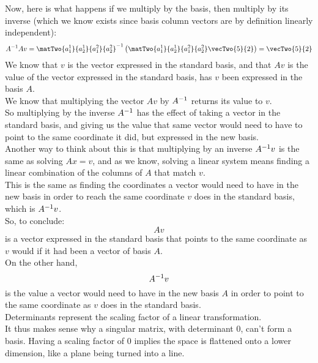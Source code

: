 \documentclass[12pt]{article}
\begin{document}
Now, here is what happens if we multiply by 
the basis, then multiply by its inverse 
(which we know exists since basis column vectors
are by definition linearly independent):
\[ A\inv Av = 
\matTwo{a_1^1}{a_2^1}{a_1^2}{a_2^2}\inv
\para{\matTwo{a_1^1}{a_2^1}{a_1^2}{a_2^2}
\vecTwo{5}{2}}
= \vecTwo{5}{2} \]
We know that $v$ is the vector
expressed in the standard basis,
and that $Av$ is the value of the vector
expressed in the standard basis,
has $v$ been expressed in the basis $A$. \\
We know that multiplying the vector $Av$ by $A^{-1}$
returns its value to $v$. \\ 
So multiplying by the inverse $A^{-1}$
has the effect of taking a vector
in the standard basis,
and giving us the value that same vector
would need to have to point to the same coordinate
it did, but expressed in the new basis. \\

Another way to think about this is that
multiplying by an inverse $A^{-1} v$
is the same as solving $Ax = v$,
and as we know,
solving a linear system
means finding a linear combination 
of the columns of $A$ that match $v$. \\
This is the same as finding the coordinates
a vector would need to have in the new basis
in order to reach the same coordinate $v$
does in the standard basis, which is $A^{-1} v$. \\

So, to conclude:
\[ Av \]
is a vector expressed in the standard basis
that points to the same coordinate as $v$
would if it had been a vector of basis $A$. \\
On the other hand,
\[ A^{-1} v \]
is the value a vector would need to have
in the new basis $A$ in order to point to the same
coordinate as $v$ does in the standard basis. \\

Determinants represent the scaling factor
of a linear transformation. \\
It thus makes sense why a singular matrix,
with determinant 0,
can't form a basis.
Having a scaling factor of 0 implies
the space is flattened onto a lower dimension,
like a plane being turned into a line. \\
\end{document}
